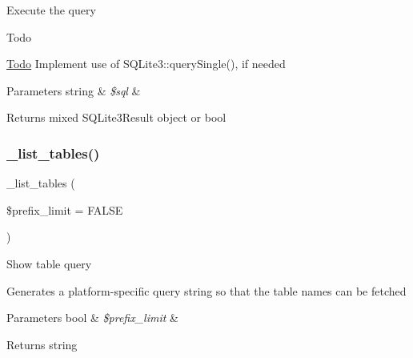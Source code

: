 Execute the query

\begin{DoxyRefDesc}{Todo}
\item[\mbox{\hyperlink{todo__todo000005}{Todo}}]Implement use of S\+Q\+Lite3\+::query\+Single(), if needed \end{DoxyRefDesc}

\begin{DoxyParams}[1]{Parameters}
string & {\em \$sql} & \\
\hline
\end{DoxyParams}
\begin{DoxyReturn}{Returns}
mixed S\+Q\+Lite3\+Result object or bool 
\end{DoxyReturn}
\mbox{\label{class_c_i___d_b__sqlite3__driver_a435c0f3ce54fe7daa178baa8532ebd54}} 
\subsubsection{\texorpdfstring{\+\_\+list\+\_\+tables()}{\_list\_tables()}}
{\footnotesize\ttfamily \+\_\+list\+\_\+tables (\begin{DoxyParamCaption}\item[{}]{\$prefix\+\_\+limit = {\ttfamily FALSE} }\end{DoxyParamCaption})\hspace{0.3cm}{\ttfamily [protected]}}

Show table query

Generates a platform-\/specific query string so that the table names can be fetched


\begin{DoxyParams}[1]{Parameters}
bool & {\em \$prefix\+\_\+limit} & \\
\hline
\end{DoxyParams}
\begin{DoxyReturn}{Returns}
string 
\end{DoxyReturn}
\mbox{\label{class_c_i___d_b__sqlite3__driver_ae0adf73984daf2d42ad29b66c484c82b}} 
